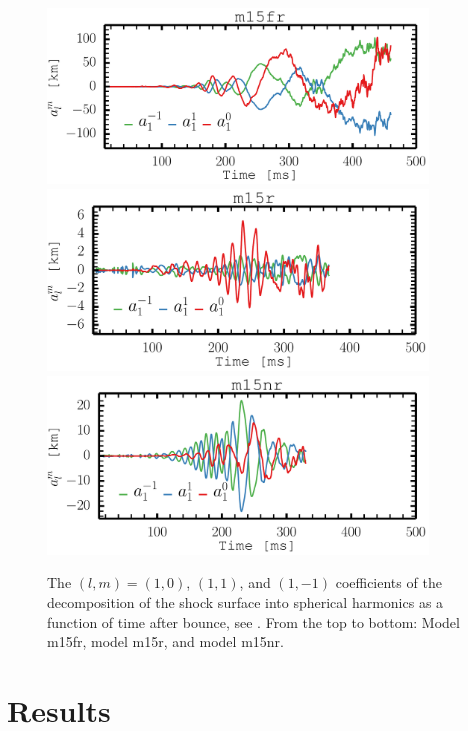 \begin{figure}[ht]         
\centering                            
\includegraphics[width=0.9\textwidth]{./images/paper2/sasi_fr.pdf}
\includegraphics[width=0.9\textwidth]{./images/paper2/sasi_r.pdf}
\includegraphics[width=0.9\textwidth]{./images/paper2/sasi_nr.pdf}
\caption{The $(l,m) = (1,0)$, $(1,1)$, and $(1,-1)$ coefficients of the decomposition of the shock surface into spherical harmonics
as a function of time after bounce, see . From the top to bottom: Model m15fr, model m15r, and model m15nr. \label{figp2:sasi}}
\end{figure}

\section{Results}
